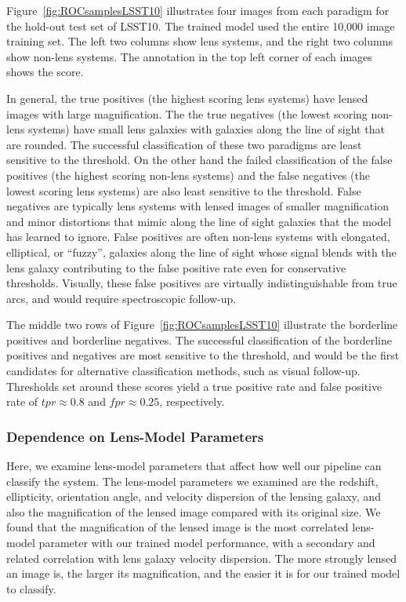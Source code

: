 \documentclass{emulateapj}
\begin{document}
Figure~\ref{fig:ROCsamplesLSST10} illustrates four images from each
paradigm for the hold-out test set of LSST10.  The trained model used
the entire 10,000 image training set.  The left two columns show lens
systems, and the right two columns show non-lens systems.  The
annotation in the top left corner of each images shows the score.

In general, the true positives (the highest scoring lens systems) have
lensed images with large magnification.  The the true negatives (the
lowest scoring non-lens systems) have small lens galaxies with
galaxies along the line of sight that are rounded.  The successful
classification of these two paradigms are least sensitive to the
threshold.  On the other hand the failed classification of the false
positives (the highest scoring non-lens systems) and the false
negatives (the lowest scoring lens systems) are also least sensitive
to the threshold.  False negatives are typically lens systems with
lensed images of smaller magnification and minor distortions that
mimic along the line of sight galaxies that the model has learned to
ignore.  False positives are often non-lens systems with elongated,
elliptical, or ``fuzzy'', galaxies along the line of sight whose signal
blends with the lens galaxy contributing to the false positive rate
even for conservative thresholds.  Visually, these false positives are
virtually indistinguishable from true arcs, and would require
spectroscopic follow-up.

The middle two rows of Figure~\ref{fig:ROCsamplesLSST10} illustrate
the borderline positives and borderline negatives. The successful
classification of the borderline positives and negatives are most
sensitive to the threshold, and would be the first candidates for
alternative classification methods, such as visual follow-up.
Thresholds set around these scores yield a true positive rate and
false positive rate of $tpr\approx0.8$ and $fpr\approx0.25$,
respectively.

\subsubsection{Dependence on Lens-Model Parameters}

Here, we examine lens-model parameters that affect how well our
pipeline can classify the system.  The lens-model parameters we
examined are the redshift, ellipticity, orientation angle, and
velocity dispersion of the lensing galaxy, and also the magnification
of the lensed image compared with its original size.  We found that
the magnification of the lensed image is the most correlated
lens-model parameter with our trained model performance, with a
secondary and related correlation with lens galaxy velocity
dispersion.  The more strongly lensed an image is, the larger its
magnification, and the easier it is for our trained model to classify.
\end{document}
